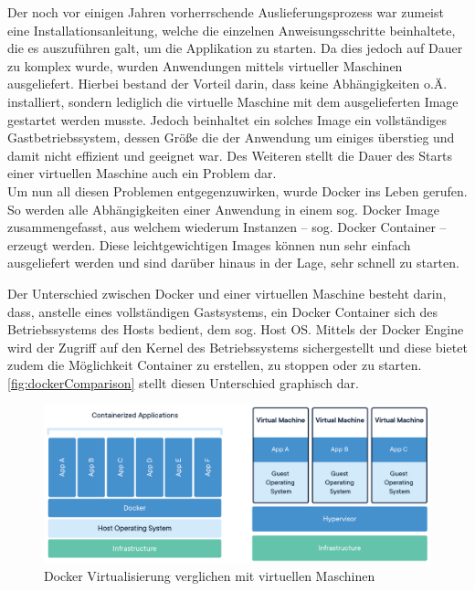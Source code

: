 			Der noch vor einigen Jahren vorherrschende Auslieferungsprozess war zumeist eine Installationsanleitung, welche die einzelnen Anweisungsschritte beinhaltete, die es auszuführen galt, um die Applikation zu starten. Da dies jedoch auf Dauer zu komplex wurde, wurden Anwendungen mittels virtueller Maschinen ausgeliefert. Hierbei bestand der Vorteil darin, dass keine Abhängigkeiten o.Ä. installiert, sondern lediglich die virtuelle Maschine mit dem ausgelieferten Image gestartet werden musste. Jedoch beinhaltet ein solches Image ein vollständiges Gastbetriebssystem, dessen Größe die der Anwendung um einiges überstieg und damit nicht effizient und geeignet war. Des Weiteren stellt die Dauer des Starts einer virtuellen Maschine auch ein Problem dar. \\
			Um nun all diesen Problemen entgegenzuwirken, wurde Docker ins Leben gerufen. So werden alle Abhängigkeiten einer Anwendung in einem sog. Docker Image zusammengefasst, aus welchem wiederum Instanzen -- sog. Docker Container -- erzeugt werden. Diese leichtgewichtigen Images können nun sehr einfach ausgeliefert werden und sind darüber hinaus in der Lage, sehr schnell zu starten. \cite{ThomasClaudiusHuber.2019}
			
			Der Unterschied zwischen Docker und einer virtuellen Maschine besteht darin, dass, anstelle eines vollständigen Gastsystems, ein Docker Container sich des Betriebssystems des Hosts bedient, dem sog. Host OS. Mittels der Docker Engine wird der Zugriff auf den Kernel des Betriebssystems sichergestellt und diese bietet zudem die Möglichkeit Container zu erstellen, zu stoppen oder zu starten. \autoref{fig:dockerComparison} stellt diesen Unterschied graphisch dar. \cite{Turnbull.2014}
			
			\begin{figure}[ht!]
				\centering
				\includegraphics[width=1\textwidth]{images/docker-containerized-and-vm-transparent-bg.png}
				\caption{Docker Virtualisierung verglichen mit virtuellen Maschinen \cite{DockerInc..2020}}
				\label{fig:dockerComparison}
			\end{figure} 
			

